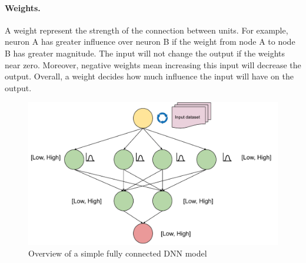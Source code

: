 \paragraph{Weights.} A weight represent the strength of the connection between units. For example, neuron A has greater influence over neuron B if the weight from node A to node B has greater magnitude. The input will not change the output if the weights near zero. Moreover, negative weights mean increasing this input will decrease the output. Overall, a weight decides how much influence the input will have on the output.
\begin{figure}
	\includegraphics[width=\linewidth]{overview}
	\caption{Overview of a simple fully connected DNN model}
	\label{fig:rq5}
\end{figure}
